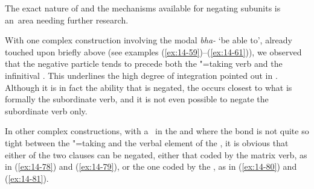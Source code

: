 The exact nature of and the mechanisms available for negating subunits is an~area needing further research.


 With one complex construction involving the modal \textit{bha-} `be able to', already touched upon briefly above (see examples (\ref{ex:14-59})--(\ref{ex:14-61})), we observed that the negative particle tends to precede both the "=taking verb and the infinitival . This underlines the high degree of  integration pointed out in . Although it is in fact the ability that is negated, the  occurs closest to what is formally the subordinate verb, and it is not even possible to negate the subordinate verb only.


In other complex constructions, with a~ in the  and where the bond is not quite so tight between the "=taking  and the verbal element of the , it is obvious that either of the two clauses can be negated, either that coded by the matrix verb, as in (\ref{ex:14-78}) and (\ref{ex:14-79}), or the one coded by the , as in (\ref{ex:14-80}) and (\ref{ex:14-81}). 

